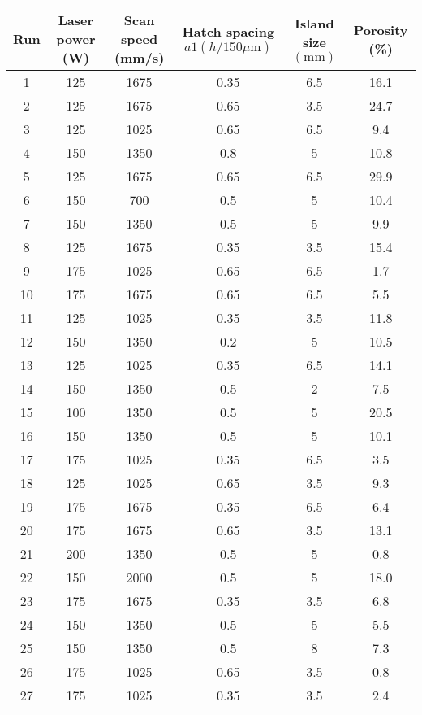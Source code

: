 \documentclass[10pt]{article}
\begin{document}
\begin{center}
\begin{tabular}{|c|c|c|c|c|c|}
\hline
Run & Laser power (W) & Scan speed (mm/s) & Hatch spacing $a 1(h / 150 \mu \mathrm{m})$ & Island size $(\mathrm{mm})$ & Porosity (\%) \\
\hline
1 & 125 & 1675 & 0.35 & 6.5 & 16.1 \\
\hline
2 & 125 & 1675 & 0.65 & 3.5 & 24.7 \\
\hline
3 & 125 & 1025 & 0.65 & 6.5 & 9.4 \\
\hline
4 & 150 & 1350 & 0.8 & 5 & 10.8 \\
\hline
5 & 125 & 1675 & 0.65 & 6.5 & 29.9 \\
\hline
6 & 150 & 700 & 0.5 & 5 & 10.4 \\
\hline
7 & 150 & 1350 & 0.5 & 5 & 9.9 \\
\hline
8 & 125 & 1675 & 0.35 & 3.5 & 15.4 \\
\hline
9 & 175 & 1025 & 0.65 & 6.5 & 1.7 \\
\hline
10 & 175 & 1675 & 0.65 & 6.5 & 5.5 \\
\hline
11 & 125 & 1025 & 0.35 & 3.5 & 11.8 \\
\hline
12 & 150 & 1350 & 0.2 & 5 & 10.5 \\
\hline
13 & 125 & 1025 & 0.35 & 6.5 & 14.1 \\
\hline
14 & 150 & 1350 & 0.5 & 2 & 7.5 \\
\hline
15 & 100 & 1350 & 0.5 & 5 & 20.5 \\
\hline
16 & 150 & 1350 & 0.5 & 5 & 10.1 \\
\hline
17 & 175 & 1025 & 0.35 & 6.5 & 3.5 \\
\hline
18 & 125 & 1025 & 0.65 & 3.5 & 9.3 \\
\hline
19 & 175 & 1675 & 0.35 & 6.5 & 6.4 \\
\hline
20 & 175 & 1675 & 0.65 & 3.5 & 13.1 \\
\hline
21 & 200 & 1350 & 0.5 & 5 & 0.8 \\
\hline
22 & 150 & 2000 & 0.5 & 5 & 18.0 \\
\hline
23 & 175 & 1675 & 0.35 & 3.5 & 6.8 \\
\hline
24 & 150 & 1350 & 0.5 & 5 & 5.5 \\
\hline
25 & 150 & 1350 & 0.5 & 8 & 7.3 \\
\hline
26 & 175 & 1025 & 0.65 & 3.5 & 0.8 \\
\hline
27 & 175 & 1025 & 0.35 & 3.5 & 2.4 \\
\hline
\end{tabular}
\end{center}
\end{document}
